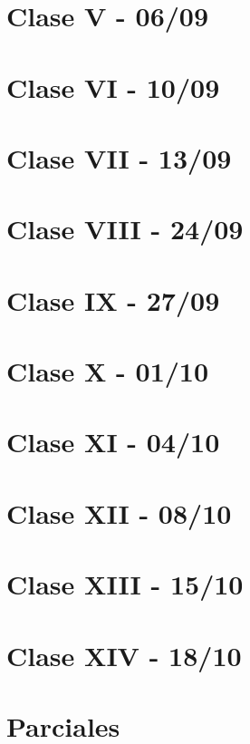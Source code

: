 \documentclass[12pt,a4paper]{book}
\begin{document}
\chapter{Clase V - 06/09}

\newpage\thispagestyle{empty}\blankpage

\chapter{Clase VI - 10/09}

\newpage\thispagestyle{empty}\blankpage

\chapter{Clase VII - 13/09}

\newpage\thispagestyle{empty}\blankpage

\chapter{Clase VIII - 24/09}

\newpage\thispagestyle{empty}\blankpage

\chapter{Clase IX - 27/09}

\newpage\thispagestyle{empty}\blankpage

\chapter{Clase X - 01/10}

\newpage\thispagestyle{empty}\blankpage

\chapter{Clase XI - 04/10}

\newpage\thispagestyle{empty}\blankpage

\chapter{Clase XII - 08/10}

\newpage\thispagestyle{empty}\blankpage

\chapter{Clase XIII - 15/10}

\newpage\thispagestyle{empty}\blankpage

\chapter{Clase XIV - 18/10}

\newpage\thispagestyle{empty}\blankpage


\chapter{Parciales}


\blankpage


\nocite{*}
\end{document}
